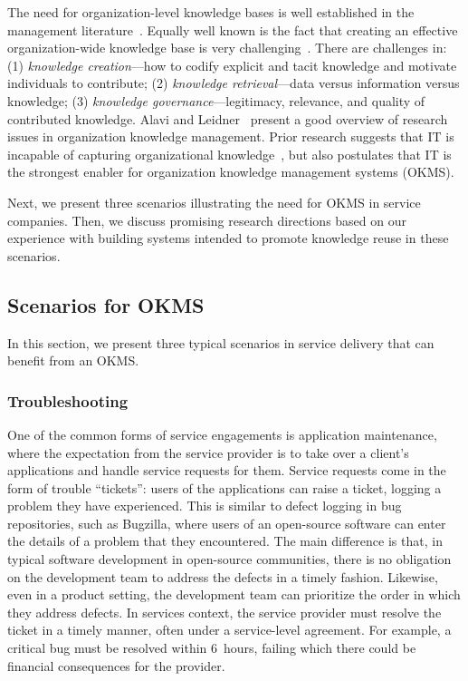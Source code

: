 The need for organization-level knowledge bases is well established in the
management literature~\cite{davenport2000working,bollinger2001managing}. Equally
well known is the fact that creating an effective organization-wide knowledge
base is very challenging~\cite{McKinsey:1999}. There are
challenges in: (1) \textit{knowledge creation}---how to codify explicit and
tacit knowledge and motivate individuals to contribute; (2) \textit{knowledge
  retrieval}---data versus information versus knowledge; (3) \textit{knowledge
  governance}---legitimacy, relevance, and quality of contributed
knowledge. Alavi and Leidner~\cite{Alavi:2001} present a good overview of
research issues in organization knowledge management. Prior research suggests
that IT is incapable of capturing organizational
knowledge~\cite{malhotra2004knowledge,mcdermott2000information}, but also
postulates that IT is the strongest enabler for organization knowledge
management systems (OKMS).

Next, we present three scenarios illustrating the need for OKMS in service
companies. Then, we discuss promising research directions based on our
experience with building systems intended to promote knowledge reuse in these
scenarios.

\subsection{Scenarios for OKMS}

In this section, we present three typical scenarios in service delivery that can
benefit from an OKMS.

\subsubsection{Troubleshooting}

One of the common forms of service engagements is application maintenance, where
the expectation from the service provider is to take over a client's
applications and handle service requests for them.  Service requests come in the
form of trouble ``tickets'': users of the applications can raise a ticket,
logging a problem they have experienced. This is similar to defect logging in
bug repositories, such as Bugzilla, where users of an open-source software can
enter the details of a problem that they encountered.  The main difference is
that, in typical software development in open-source communities, there is no
obligation on the development team to address the defects in a timely
fashion. Likewise, even in a product setting, the development team can
prioritize the order in which they address defects.  In services context, the
service provider must resolve the ticket in a timely manner, often under a
service-level agreement. For example, a critical bug must be resolved within
6~hours, failing which there could be financial consequences for the provider.

